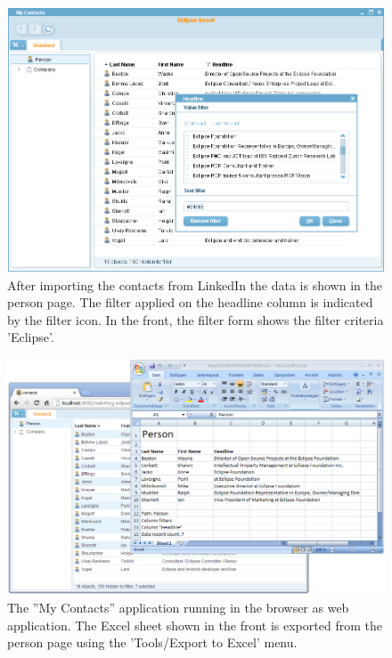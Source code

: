 \documentclass[a4paper,10pt,twoside]{book}
\begin{document}
\begin{figure}
\includegraphics[width=14cm]{my_contacts_rayo_filteredcontacts.png} 
\caption{After importing the contacts from LinkedIn the data is shown in the person page. 
The filter applied on the headline column is indicated by the filter icon. In the front, the filter form shows the filter criteria 'Eclipse'.}
\end{figure}

\begin{figure}
\includegraphics[width=14cm]{my_contacts_rapweb_excelexport.png} 
\caption{The ''My Contacts'' application running in the browser as web application. 
The Excel sheet shown in the front is exported from the person page using the 'Tools/Export to Excel' menu. }
\end{figure}
\end{document}
